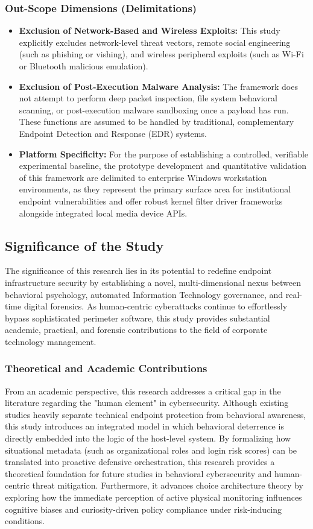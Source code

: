 \documentclass{ieeeaccess}
\begin{document}
\subsubsection{Out-Scope Dimensions (Delimitations)}
\begin{itemize}
    \item \textbf{Exclusion of Network-Based and Wireless Exploits:} This study explicitly excludes network-level threat vectors, remote social engineering (such as phishing or vishing), and wireless peripheral exploits (such as Wi-Fi or Bluetooth malicious emulation).
    \item \textbf{Exclusion of Post-Execution Malware Analysis:} The framework does not attempt to perform deep packet inspection, file system behavioral scanning, or post-execution malware sandboxing once a payload has run. These functions are assumed to be handled by traditional, complementary Endpoint Detection and Response (EDR) systems.
    \item \textbf{Platform Specificity:} For the purpose of establishing a controlled, verifiable experimental baseline, the prototype development and quantitative validation of this framework are delimited to enterprise Windows workstation environments, as they represent the primary surface area for institutional endpoint vulnerabilities and offer robust kernel filter driver frameworks alongside integrated local media device APIs.
\end{itemize}

 \subsection{Significance of the Study}
The significance of this research lies in its potential to redefine endpoint infrastructure security by establishing a novel, multi-dimensional nexus between behavioral psychology, automated Information Technology governance, and real-time digital forensics. As human-centric cyberattacks continue to effortlessly bypass sophisticated perimeter software, this study provides substantial academic, practical, and forensic contributions to the field of corporate technology management.

\subsubsection{Theoretical and Academic Contributions}
From an academic perspective, this research addresses a critical gap in the literature regarding the "human element" in cybersecurity. Although existing studies heavily separate technical endpoint protection from behavioral awareness, this study introduces an integrated model in which behavioral deterrence is directly embedded into the logic of the host-level system. By formalizing how situational metadata (such as organizational roles and login risk scores) can be translated into proactive defensive orchestration, this research provides a theoretical foundation for future studies in behavioral cybersecurity and human-centric threat mitigation. Furthermore, it advances choice architecture theory by exploring how the immediate perception of active physical monitoring influences cognitive biases and curiosity-driven policy compliance under risk-inducing conditions.
\end{document}
